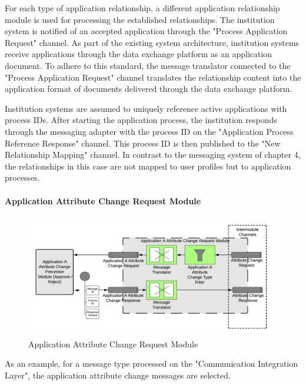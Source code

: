 For each type of application relationship, a different application relationship module is used for processing the established relationships. The institution system is notified of an accepted application through the "Process Application Request" channel. As part of the existing system architecture, institution systems receive applications through the data exchange platform as an application document. To adhere to this standard, the message translator connected to the "Process Application Request" channel translates the relationship content into the application format of documents delivered through the data exchange platform.

Institution systems are assumed to uniquely reference active applications with process IDs. After starting the application process, the institution responds through the messaging adapter with the process ID on the "Application Process Reference Response" channel. This process ID is then published to the "New Relationship Mapping" channel. In contrast to the messaging system of chapter 4, the relationships in this case are not mapped to user profiles but to application processes.

\paragraph{Application Attribute Change Request Module}

\begin{figure}[H]
    \centering
    \includegraphics[scale=0.6]{Diagrams/Integration Architecture 2/Technological Integration/7. Application Attribute Change Request Module.pdf}
    \caption{Application Attribute Change Request Module}
    \label{integration2:application_attribute_change_request_module}
\end{figure}

As an example, for a message type processed on the "Communication Integration Layer", the application attribute change messages are selected.

